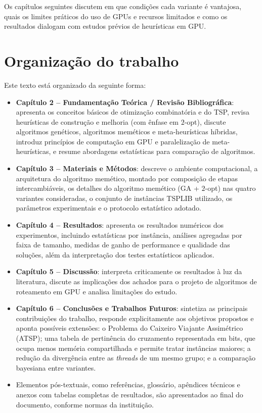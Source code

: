 Os capítulos seguintes discutem em que condições cada variante é vantajosa, quais os limites práticos do uso de GPUs e recursos limitados e como os resultados dialogam com estudos prévios de heurísticas em GPU.

\section{Organização do trabalho}\label{sec-16-organizacao}

Este texto está organizado da seguinte forma:

\begin{itemize}
      \tightlist
      \item
            \textbf{Capítulo 2 -- Fundamentação Teórica / Revisão Bibliográfica}: apresenta os conceitos básicos de otimização combinatória e do TSP, revisa heurísticas de construção e melhoria (com ênfase em \(2\)-opt), discute algoritmos genéticos, algoritmos meméticos e meta-heurísticas híbridas, introduz princípios de computação em GPU e paralelização de meta-heurísticas, e resume abordagens estatísticas para comparação de algoritmos.
      \item
            \textbf{Capítulo 3 -- Materiais e Métodos}: descreve o ambiente computacional, a arquitetura do algoritmo memético, montado por composição de etapas intercambiáveis, os detalhes do algoritmo memético (GA + \(2\)-opt) nas quatro variantes consideradas, o conjunto de instâncias TSPLIB utilizado, os parâmetros experimentais e o protocolo estatístico adotado.
      \item
            \textbf{Capítulo 4 -- Resultados}: apresenta os resultados numéricos dos experimentos, incluindo estatísticas por instância, análises agregadas por faixa de tamanho, medidas de ganho de performance e qualidade das soluções, além da interpretação dos testes estatísticos aplicados.
      \item
            \textbf{Capítulo 5 -- Discussão}: interpreta criticamente os resultados à luz da literatura, discute as implicações dos achados para o projeto de algoritmos de roteamento em GPU e analisa limitações do estudo.
      \item
            \textbf{Capítulo 6 -- Conclusões e Trabalhos Futuros}: sintetiza as principais contribuições do trabalho, responde explicitamente aos objetivos propostos e aponta possíveis extensões: o Problema do Caixeiro Viajante Assimétrico (ATSP); uma tabela de pertinência do cruzamento representada em bits, que ocupa menos memória compartilhada e permite tratar instâncias maiores; a redução da divergência entre as \emph{threads} de um mesmo grupo; e a comparação bayesiana entre variantes.
      \item Elementos pós-textuais, como referências, glossário, apêndices técnicos e anexos com tabelas completas de resultados, são apresentados ao final do documento, conforme normas da instituição.
\end{itemize}


